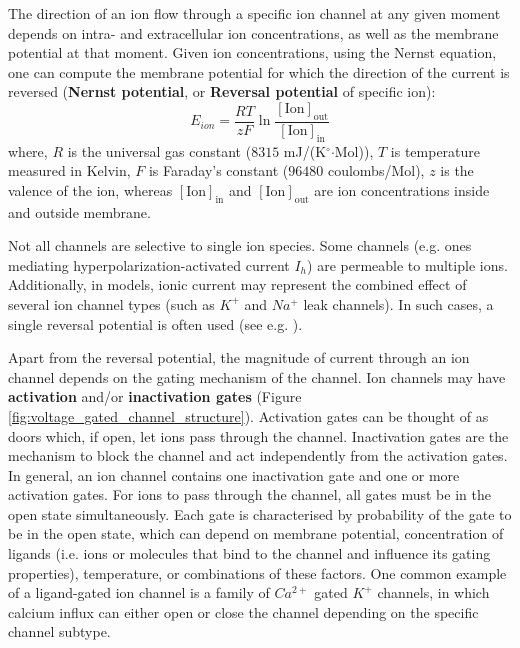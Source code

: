 \documentclass[../main.tex]{subfiles}
\begin{document}
The direction of an ion flow through a specific ion channel at any given moment depends on intra- and extracellular ion concentrations, as well as the membrane potential at that moment. Given ion concentrations, using the Nernst equation, one can compute the membrane potential for which the direction of the current is reversed \cite{izhikevichDynamicalSystemsNeuroscience2006} (\textbf{Nernst potential}, or \textbf{Reversal potential} of specific ion):
\begin{equation}\label{eq:nernst_equation}
    E_{ion} = \frac{RT}{zF} \ln \frac{[\text{Ion}]_{\text{out}}}{[\text{Ion}]_{\text{in}}}
\end{equation}
where, $R$ is the universal gas constant ($8315$ mJ/(K$^\circ$$\cdot$Mol)), $T$ is temperature measured in Kelvin, $F$ is Faraday's constant ($96480$ coulombs/Mol), $z$ is the valence of the ion, whereas $[\text{Ion}]_{\text{in}}$ and $[\text{Ion}]_{\text{out}}$ are ion concentrations inside and outside membrane.

Not all channels are selective to single ion species. Some channels (e.g. ones mediating hyperpolarization-activated current $I_h$) are permeable to multiple ions. Additionally, in models, ionic current may represent the combined effect of several ion channel types (such as $K^+$ and $Na^+$ leak channels). In such cases, a single reversal potential is often used (see e.g. \cite{wangMultipleDynamicalModes1994}).

Apart from the reversal potential, the magnitude of current through an ion channel depends on the gating mechanism of the channel. Ion channels may have \textbf{activation} and/or \textbf{inactivation gates} (Figure \ref{fig:voltage_gated_channel_structure}). Activation gates can be thought of as doors which, if open, let ions pass through the channel. Inactivation gates are the mechanism to block the channel and act independently from the activation gates. In general, an ion channel contains one inactivation gate and one or more activation gates. For ions to pass through the channel, all gates must be in the open state simultaneously. Each gate is characterised by probability of the gate to be in the open state, which can depend on membrane potential, concentration of ligands (i.e. ions or molecules that bind to the channel and influence its gating properties), temperature, or combinations of these factors. One common example of a ligand-gated ion channel is a family of $Ca^{2+}$ gated $K^+$ channels, in which calcium influx can either open or close the channel depending on the specific channel subtype.
\end{document}
